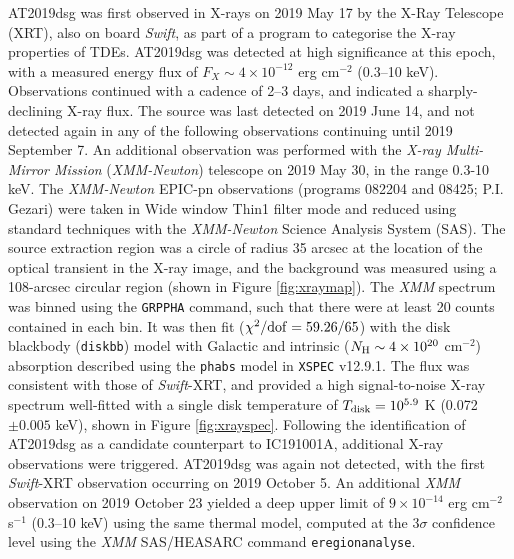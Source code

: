 \documentclass{nature_plusfigure}
\begin{document}
\begin{methods}
AT2019dsg was first observed in X-rays on 2019 May 17 by the X-Ray Telescope (XRT)\cite{2005SSRv..120..165B}, also on board \textit{Swift}\cite{2004ApJ...611.1005G}, as part of a program to categorise the X-ray properties of TDEs. AT2019dsg was detected at high significance at this epoch, with a measured energy flux of $F_{X}\sim 4 \times 10^{-12}$ erg cm$^{-2}$ (0.3--10 keV). Observations continued with a cadence of 2--3 days, and indicated a sharply-declining X-ray flux. The source was last detected on 2019 June 14, and not detected again in any of the following observations continuing until 2019 September 7. An additional observation was performed with the \textit{X-ray Multi-Mirror Mission} (\textit{XMM-Newton}) telescope on 2019 May 30, in the range 0.3-10 keV. The \textit{XMM-Newton} EPIC-pn observations (programs 082204 and 08425; P.I. Gezari) were taken in Wide window Thin1 filter mode and reduced using standard techniques with the \textit{XMM-Newton}\cite{2001A&A...365L...1J} Science Analysis System (SAS). The source extraction region was a circle of radius 35 arcsec at the location of the optical transient in the X-ray image, and the background was measured using a 108-arcsec circular region (shown in Figure \ref{fig:xraymap}). The \textit{XMM} spectrum was binned using the \texttt{GRPPHA} command, such that there were at least 20 counts contained in each bin. It was then fit ($\chi^2/\rm{dof}=59.26/65$) with the  disk blackbody (\texttt{diskbb}) model with Galactic\cite{HI4PI2016} and intrinsic ($N_{\rm{H}} \sim 4 \times 10^{20}$ cm$^{-2}$) absorption described using the \texttt{phabs} model in \texttt{XSPEC} v12.9.1\cite{1996ASPC..101...17A}. The flux was consistent with those of \textit{Swift}-XRT, and provided a high signal-to-noise X-ray spectrum well-fitted with a single disk temperature of $T_{\rm disk} = 10^{5.9}$ K (0.072 $\pm 0.005$ keV), shown in Figure \ref{fig:xrayspec}. Following the identification of AT2019dsg as a candidate counterpart to IC191001A\cite{2019ATel13160....1S}, additional X-ray observations were triggered. AT2019dsg was again not detected, with the first \textit{Swift}-XRT observation occurring on 2019 October 5. An additional \textit{XMM} observation on 2019 October 23 yielded a deep upper limit of $9 \times 10^{-14}$ erg cm$^{-2}$ s$^{-1}$ (0.3--10 keV) using the same thermal model, computed at the 3$\sigma$ confidence level using the \textit{XMM} SAS/HEASARC command \texttt{eregionanalyse}. 


\end{methods}
\end{document}
